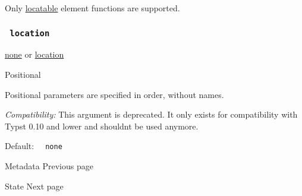 Only
\href{/docs/reference/introspection/location/\#locatable}{locatable}
element functions are supported.

\subsubsection{\texorpdfstring{\texttt{\ location\ }}{ location }}\label{parameters-location}

\href{/docs/reference/foundations/none/}{none} {or}
\href{/docs/reference/introspection/location/}{location}

{{ Positional }}

\label{parameters-location-positional-tooltip}
Positional parameters are specified in order, without names.

\emph{Compatibility:} This argument is deprecated. It only exists for
compatibility with Typst 0.10 and lower and shouldn\textquotesingle t be
used anymore.

Default: \texttt{\ }{\texttt{\ none\ }}\texttt{\ }

\href{/docs/reference/introspection/metadata/}{\pandocbounded{}}

{ Metadata } { Previous page }

\href{/docs/reference/introspection/state/}{\pandocbounded{}}

{ State } { Next page }
